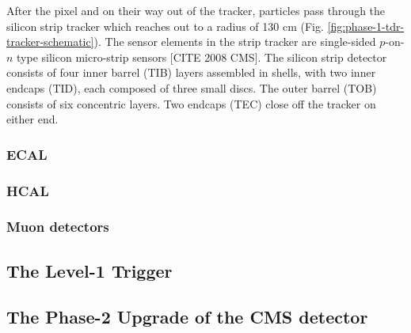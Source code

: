 \documentclass{article}
\begin{document}
After the pixel and on their way out of the tracker, particles pass through the silicon strip tracker which reaches out to a radius of 130 cm (Fig. \ref{fig:phase-1-tdr-tracker-schematic}). The sensor elements in the strip tracker are single-sided $p$-on-$n$ type silicon micro-strip sensors [CITE 2008 CMS]. The silicon strip detector consists of four inner barrel (TIB) layers assembled in shells, with two inner endcaps (TID), each composed of three small discs. The outer barrel (TOB) consists of six concentric layers. Two endcaps (TEC) close off the tracker on either end. 


\subsubsection{ECAL} 



\subsubsection{HCAL}

\subsubsection{Muon detectors}

\subsection{The Level-1 Trigger}

\subsection{The Phase-2 Upgrade of the CMS detector}
\end{document}
